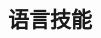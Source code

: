 \documentclass[11pt,a4paper,sans]{moderncv}
\begin{document}
\begin{CJK}{UTF8}{gbsn}
\section{语言技能}


\clearpage\end{CJK}
\end{document}
